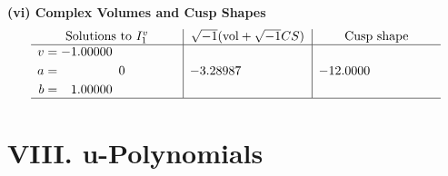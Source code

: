 \documentclass[1p]{elsarticle_modified}
\theoremstyle{definition}
\newcommand{\I}{\sqrt{-1}}
\begin{document}
\newpage\flushleft \textbf{(vi) Complex Volumes and Cusp Shapes}
$$\begin{array}{c|c|c}  
\text{Solutions to }I^v_{1}& \I (\text{vol} + \sqrt{-1}CS) & \text{Cusp shape}\\
 \hline 
\begin{aligned}
v &= -1.00000\phantom{ +0.000000I} \\
a &= \phantom{-0.000000 } 0 \\
b &= \phantom{-}1.00000\phantom{ +0.000000I}\end{aligned}
 & -3.28987\phantom{ +0.000000I} & -12.0000\phantom{ +0.000000I}\\
 \hline 
 \end{array}$$\newpage
\newpage\renewcommand{\arraystretch}{1}
\centering \section*{ VIII. u-Polynomials}
\end{document}

